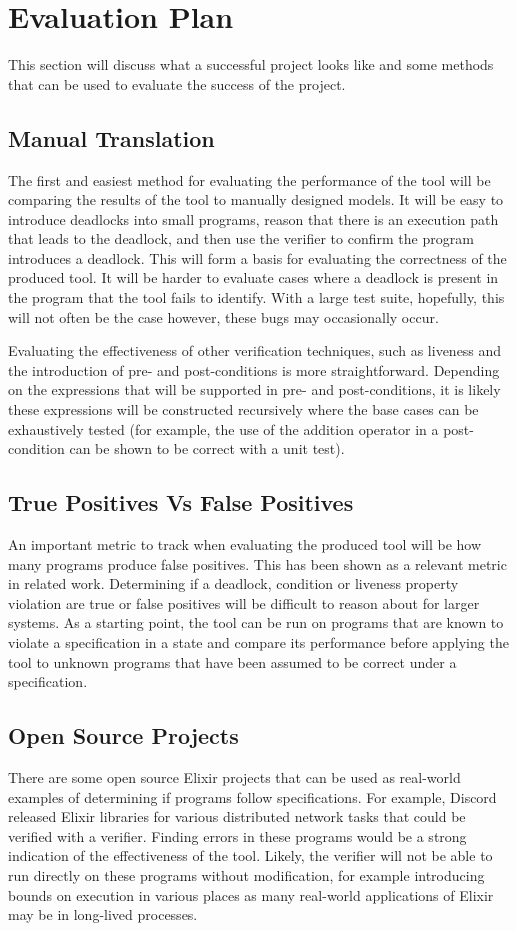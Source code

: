 \chapter{Evaluation Plan}
This section will discuss what a successful project looks like and some methods that can be used to evaluate the success of the project.

\section{Manual Translation}
The first and easiest method for evaluating the performance of the tool will be comparing the results of the tool to manually designed models. It will be easy to introduce deadlocks into small programs, reason that there is an execution path that leads to the deadlock, and then use the verifier to confirm the program introduces a deadlock. This will form a basis for evaluating the correctness of the produced tool. It will be harder to evaluate cases where a deadlock is present in the program that the tool fails to identify. With a large test suite, hopefully, this will not often be the case however, these bugs may occasionally occur.
\par
Evaluating the effectiveness of other verification techniques, such as liveness and the introduction of pre- and post-conditions is more straightforward. Depending on the expressions that will be supported in pre- and post-conditions, it is likely these expressions will be constructed recursively where the base cases can be exhaustively tested (for example, the use of the addition operator in a post-condition can be shown to be correct with a unit test).

\section{True Positives Vs False Positives}
An important metric to track when evaluating the produced tool will be how many programs produce false positives. This has been shown as a relevant metric in related work. Determining if a deadlock, condition or liveness property violation are true or false positives will be difficult to reason about for larger systems. As a starting point, the tool can be run on programs that are known to violate a specification in a state and compare its performance before applying the tool to unknown programs that have been assumed to be correct under a specification.

\section{Open Source Projects}
There are some open source Elixir projects that can be used as real-world examples of determining if programs follow specifications. For example, Discord released Elixir libraries for various distributed network tasks that could be verified with a verifier. Finding errors in these programs would be a strong indication of the effectiveness of the tool. Likely, the verifier will not be able to run directly on these programs without modification, for example introducing bounds on execution in various places as many real-world applications of Elixir may be in long-lived processes.

